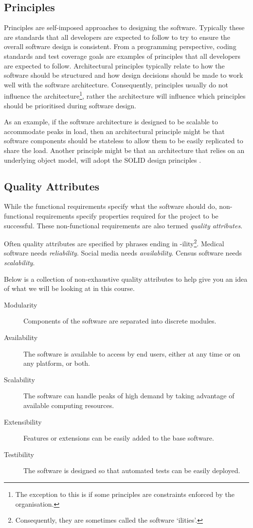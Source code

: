 \subsection{Principles}
Principles are self-imposed approaches to designing the software.
Typically these are standards that all developers are expected to follow to try to ensure the overall software design is consistent.
From a programming perspective, coding standards and test coverage goals are examples of principles that all developers are expected to follow.
Architectural principles typically relate to how the software should be structured and how design decisions should be made to work well with the software architecture.
Consequently, principles usually do not influence the architecture\footnote{The exception to this is if some principles are constraints enforced by the organisation.},
rather the architecture will influence which principles should be prioritised during software design.

As an example, if the software architecture is designed to be scalable to accommodate peaks in load,
then an architectural principle might be that software components should be stateless to allow them to be easily replicated to share the load.
Another principle might be that an architecture that relies on an underlying object model, will adopt the SOLID design principles \cite{martin-principles-patterns}.

\subsection{Quality Attributes}
While the functional requirements specify what the software should do,
non-functional requirements specify properties required for the project to be successful.
These non-functional requirements are also termed \emph{quality attributes}.

Often quality attributes are specified by phrases ending in -ility\footnote{Consequently, they are sometimes called the software `ilities'.}.
Medical software needs \textit{reliability}.
Social media needs \textit{availability}.
Census software needs \textit{scalability}.

Below is a collection of non-exhaustive quality attributes to help give you an idea of what we will be looking at in this course.

\begin{description}
    \item[Modularity] Components of the software are separated into discrete modules.
    \item[Availability] The software is available to access by end users, either at any time or on any platform, or both.
    \item[Scalability] The software can handle peaks of high demand by taking advantage of available computing resources.
    \item[Extensibility] Features or extensions can be easily added to the base software.
    \item[Testibility] The software is designed so that automated tests can be easily deployed.
\end{description}

